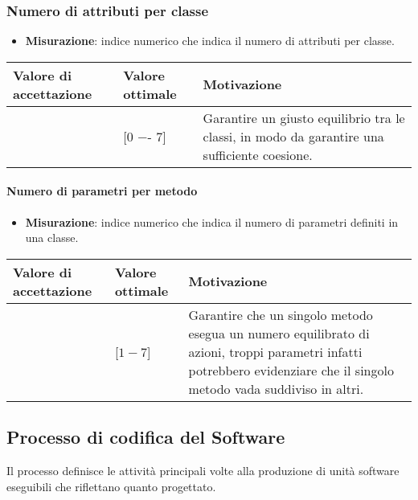 \subsubsection{Numero di attributi per classe}

\begin{itemize}
\item \textbf{Misurazione}: indice numerico che indica il numero di attributi per classe.
\end{itemize}

\begin{center}
		\begin{tabular}{|P{2.5cm}|P{2.5cm}|P{6cm}|}
		\hline
			\textbf{Valore di accettazione}	& \textbf{Valore ottimale} & \textbf{Motivazione} \\
			\hline
			[0 −- 11] & [0 −- 7] &	Garantire un giusto equilibrio tra le classi, in modo da garantire una sufficiente coesione. \\
			\hline
			\end{tabular}
\end{center}

\paragraph{Numero di parametri per metodo}

\begin{itemize}
\item \textbf{Misurazione}: indice numerico che indica il numero di parametri definiti in una classe.
\end{itemize}


\begin{center}
\begin{tabular}{|P{2.5cm}|P{2.5cm}|P{6cm}|}
		\hline
			\textbf{Valore di accettazione}	& \textbf{Valore ottimale} & \textbf{Motivazione} \\
			\hline
			[$1 - 15$] & [$1 - 7$] &	Garantire che un singolo metodo esegua un numero equilibrato di azioni, troppi parametri infatti potrebbero evidenziare che il singolo metodo vada suddiviso in altri. \\
			\hline
			\end{tabular}
\end{center}

\subsection{Processo di codifica del Software}
Il processo definisce le attività principali volte alla produzione di unità software eseguibili che riflettano quanto progettato.

